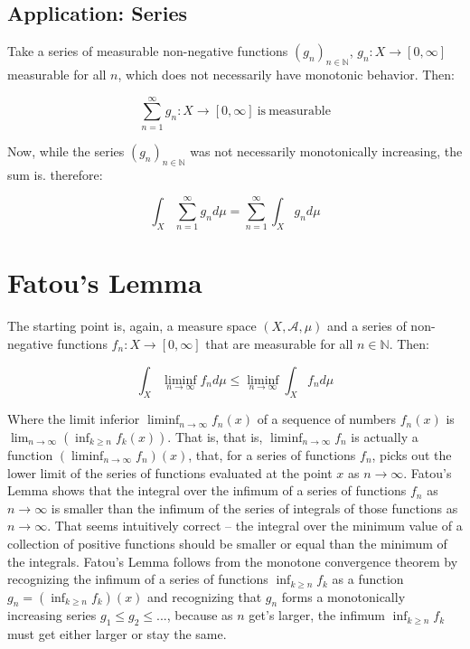  
\subsection{Application: Series}

Take a series of measurable non-negative functions $(g_n)_{n\in \mathbb{N}}$, $g_n: X \rightarrow [0,\infty]$ measurable for all $n$, which does not necessarily have monotonic behavior. Then:

\begin{equation}
\sum_{n=1}^{\infty} g_n : X \rightarrow [0,\infty] \mathrm{\ is\ measurable}
\end{equation}

Now, while the series $(g_n)_{n\in \mathbb{N}}$ was not necessarily monotonically increasing, the sum is. therefore:

\begin{equation}
\int_X \sum_{n=1}^{\infty} g_n d\mu = \sum_{n=1}^{\infty} \int_X g_n d\mu
\end{equation}


\section{Fatou's Lemma}
The starting point is, again, a measure space $(X,\mathscr{A},\mu)$ and a series of non-negative functions $f_n : X\rightarrow [0,\infty]$ that are measurable for all $n\in \mathbb{N}$. Then:

\begin{equation}
\int_X \liminf_{n\rightarrow \infty} f_n d \mu \leq \liminf_{n\rightarrow\infty}\int_X f_n d\mu
\end{equation}

Where the limit inferior $\liminf_{n\rightarrow \infty} f_n(x)$ of a sequence of numbers $f_n(x)$ is $\lim_{n\rightarrow\infty} (\inf_{k\geq n} f_k (x))$. That is, that is, $\liminf_{n\rightarrow \infty} f_n$ is actually a function $(\liminf_{n\rightarrow \infty} f_n)(x)$, that, for a series of functions $f_n$, picks out the lower limit of the series of functions evaluated at the point $x$ as $n\rightarrow \infty$. Fatou's Lemma shows that the integral over the infimum of a series of functions $f_n$ as $n\rightarrow \infty$ is smaller than the infimum of the series of integrals of those functions as $n\rightarrow \infty$. That seems intuitively correct -- the integral over the minimum value of a collection of positive functions should be smaller or equal than the minimum of the integrals.  Fatou's Lemma follows from the monotone convergence theorem by recognizing the infimum of a series of functions $\inf_{k\geq n}f_k$ as a function $g_n = (\inf_{k\geq n}f_k)(x)$ and recognizing that $g_n$ forms a monotonically increasing series $g_1 \leq g_2 \leq ...$, because as $n$ get's larger, the infimum $\inf_{k\geq n} f_k$ must get either larger or stay the same.



